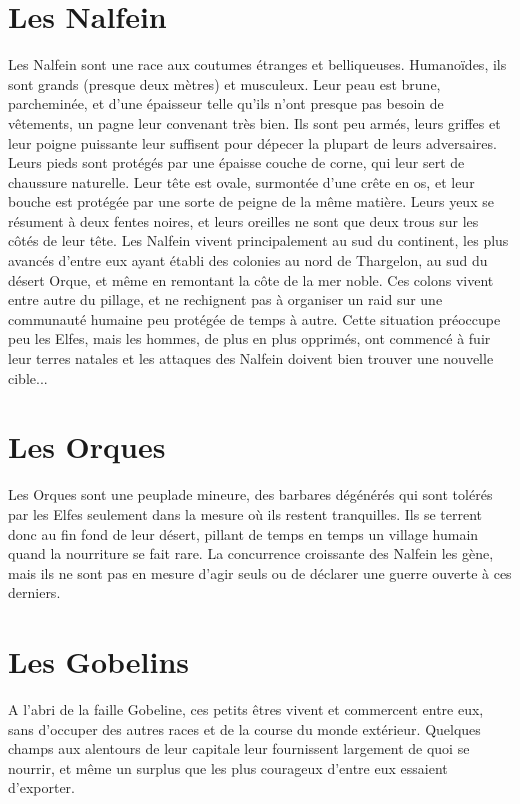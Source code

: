 \section{Les Nalfein}
Les Nalfein sont une race aux coutumes étranges et belliqueuses. Humanoïdes, ils sont grands (presque deux mètres) et musculeux. Leur peau est brune, parcheminée, et d'une épaisseur telle qu'ils n'ont presque pas besoin de vêtements, un pagne leur convenant très bien. Ils sont peu armés, leurs griffes et leur poigne puissante leur suffisent pour dépecer la plupart de leurs adversaires. Leurs pieds sont protégés par une épaisse couche de corne, qui leur sert de chaussure naturelle. Leur tête est ovale, surmontée d'une crête en os, et leur bouche est protégée par une sorte de peigne de la même matière. Leurs yeux se résument à deux fentes noires, et leurs oreilles ne sont que deux trous sur les côtés de leur tête. Les Nalfein vivent principalement au sud du continent, les plus avancés d'entre eux ayant établi des colonies au nord de Thargelon, au sud du désert Orque, et même en remontant la côte de la mer noble. Ces colons vivent entre autre du pillage, et ne rechignent pas à organiser un raid sur une communauté humaine peu protégée de temps à autre. Cette situation préoccupe peu les Elfes, mais les hommes, de plus en plus opprimés, ont commencé à fuir leur terres natales et les attaques des Nalfein doivent bien trouver une nouvelle cible...


\section{Les Orques}
Les Orques sont une peuplade mineure, des barbares dégénérés qui sont tolérés par les Elfes seulement dans la mesure où ils restent tranquilles. Ils se terrent donc au fin fond de leur désert, pillant de temps en temps un village humain quand la nourriture se fait rare. La concurrence croissante des Nalfein les gène, mais ils ne sont pas en mesure d'agir seuls ou de déclarer une guerre ouverte à ces derniers.

\section{Les Gobelins}
A l'abri de la faille Gobeline, ces petits êtres vivent et commercent entre eux, sans d'occuper des autres races et de la course du monde extérieur. Quelques champs aux alentours de leur capitale leur fournissent largement de quoi se nourrir, et même un surplus que les plus courageux d'entre eux essaient d'exporter.